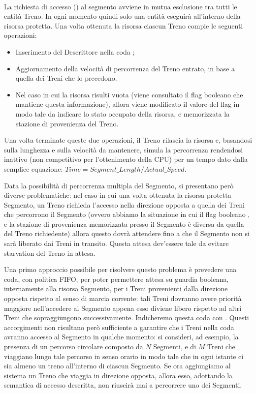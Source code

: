		\begin{description}
			
			\item {} \\
			
			La richiesta di accesso () al segmento avviene in mutua esclusione tra tutti le entità Treno. In ogni momento quindi solo una entità eseguirà all'interno della risorsa protetta. Una volta ottenuta la risorsa ciascun Treno compie le seguenti operazioni:
			 \begin{itemize}
			 	\item Inserimento del Descrittore nella coda ;
			 	\item Aggiornamento della velocità di percorrenza del Treno entrato, in base a quella dei Treni che lo precedono.
			 	\item Nel caso in cui la risorsa risulti vuota (viene consultato il flag booleano che mantiene questa informazione), allora viene modificato il valore del flag in modo tale da indicare lo stato occupato della risorsa, e memorizzata la stazione di provenienza del Treno.
			\end{itemize}
			Una volta terminate queste due operazioni, il Treno rilascia la risorsa e, basandosi sulla lunghezza e sulla velocità da mantenere, simula la percorrenza rendendosi inattivo (non competitivo per l'ottenimento della CPU) per un tempo dato dalla semplice equazione: $ Time = Segment\_Length / Actual\_Speed $.
			
			Data la possibilità di percorrenza multipla del Segmento, si presentano però diverse problematiche: nel caso in cui una volta ottenuta la risorsa protetta Segmento, un Treno richieda l'accesso nella direzione opposta a quella dei Treni che percorrono il Segmento (ovvero abbiamo la situazione in cui il flag booleano , e la stazione di provenienza memorizzata presso il Segmento è diversa da quella del Treno richiedente) allora questo dovrà attendere fino a che il Segmento non si sarà liberato dai Treni in transito. Questa attesa dev'essere tale da evitare starvation del Treno in attesa.
			
			Una primo approccio possibile per risolvere questo problema è prevedere una coda, con politica FIFO, per poter permettere attesa su guardia booleana, internamente alla risorsa Segmento, per i Treni provenienti dalla direzione opposta rispetto al senso di marcia corrente: tali Treni dovranno avere priorità maggiore nell'accedere al Segmento appena esso diviene libero rispetto ad altri Treni che sopraggiungono successivamente. Indicheremo questa coda con .
			Questi accorgimenti non risultano però sufficiente a garantire che i Treni nella coda avranno accesso al Segmento in qualche momento: si consideri, ad esempio, la presenza di un percorso circolare composto da $N$ Segmenti, e di $M$ Treni che viaggiano lungo tale percorso in senso orario in modo tale che in ogni istante ci sia almeno un treno all'interno di ciascun Segmento. Se ora aggiungiamo al sistema un Treno che viaggia in direzione opposta, allora esso, adottando la semantica di accesso descritta, non riuscirà mai a percorrere uno dei Segmenti.			
			

\end{description}
